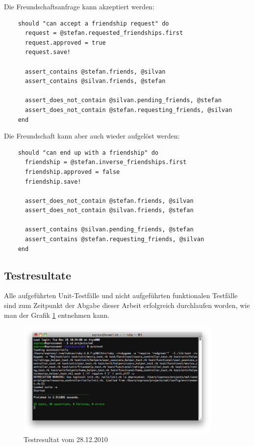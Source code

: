 Die Freundschaftsanfrage kann akzeptiert werden:

\begin{verbatim}
    should "can accept a friendship request" do
      request = @stefan.requested_friendships.first
      request.approved = true
      request.save!
      
      assert_contains @stefan.friends, @silvan
      assert_contains @silvan.friends, @stefan
      
      assert_does_not_contain @silvan.pending_friends, @stefan
      assert_does_not_contain @stefan.requesting_friends, @silvan
    end
\end{verbatim}

Die Freundschaft kann aber auch wieder aufgelöst werden:

\begin{verbatim}
    should "can end up with a friendship" do
      friendship = @stefan.inverse_friendships.first
      friendship.approved = false
      friendship.save!
      
      assert_does_not_contain @stefan.friends, @silvan
      assert_does_not_contain @silvan.friends, @stefan
      
      assert_contains @silvan.pending_friends, @stefan
      assert_contains @stefan.requesting_friends, @silvan 
    end
\end{verbatim}

\subsection{Testresultate}
Alle aufgeführten Unit-Testfälle und nicht aufgeführten funktionalen Testfälle
sind zum Zeitpunkt der Abgabe dieser Arbeit erfolgreich durchlaufen worden, 
wie man der Grafik \ref{testresultate} entnehmen kann.

\begin{figure}[ht]
    \begin{center}
        \includegraphics[width=0.9\textwidth,angle=0]{./bilder/testresultate.png}
        \caption{Testresultat vom 28.12.2010}
        \label{testresultate}
    \end{center}
\end{figure}